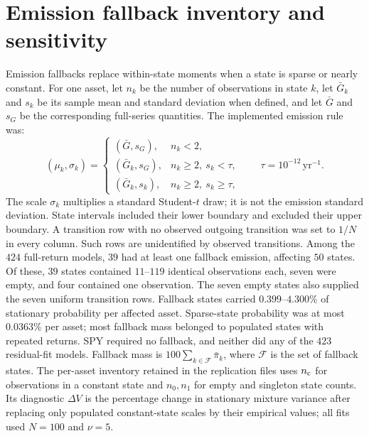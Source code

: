 \section{Emission fallback inventory and sensitivity}
\label{sec:supp-fallback}

Emission fallbacks replace within-state moments when a state is sparse or nearly constant. For one asset, let $n_k$ be the
number of observations in state $k$, let $\bar G_k$ and $s_k$ be
its sample mean and standard deviation when defined, and let
$\bar G$ and $s_G$ be the corresponding full-series quantities.
The implemented emission rule was:
\begin{equation}
 (\mu_k,\sigma_k)=
 \begin{cases}
   (\bar G,s_G), & n_k<2,\\
   (\bar G_k,s_G), & n_k\ge2,\ s_k<\tau,\\
   (\bar G_k,s_k), & n_k\ge2,\ s_k\ge\tau,
 \end{cases}
 \qquad \tau=10^{-12}\,\mathrm{yr}^{-1}.
 \label{eq:emission-fallback}
\end{equation}
The scale $\sigma_k$ multiplies a standard Student-$t$ draw; it is
not the emission standard deviation. State intervals included their
lower boundary and excluded their upper boundary. A transition row
with no observed outgoing transition was set to $1/N$ in every
column. Such rows are unidentified by observed transitions. Among the $424$ full-return models, $39$ had
at least one fallback emission, affecting $50$ states. Of these,
$39$ states contained $11$--$119$ identical observations each,
seven were empty, and four contained one observation. The seven
empty states also supplied the seven uniform transition rows.
Fallback states carried $0.399$--$4.300\%$ of stationary probability
per affected asset. Sparse-state probability was at most $0.0363\%$
per asset; most fallback mass belonged to populated states with
repeated returns. SPY required no fallback, and neither did any of
the $423$ residual-fit models. Fallback mass is $100\sum_{k\in\mathcal F}\bar\pi_k$, where $\mathcal F$ is the set of fallback states. The per-asset inventory retained in the replication files uses $n_{\rm c}$ for observations in a constant state and $n_0,n_1$ for empty and singleton state counts. Its diagnostic $\Delta V$ is the percentage change in stationary mixture variance after replacing only populated constant-state scales by their empirical values; all fits used $N=100$ and $\nu=5$.

